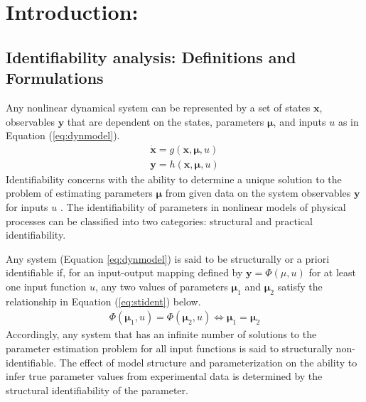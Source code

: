 \documentclass[10pt]{article}
\begin{document}
	\section{Introduction:}
	\subsection{Identifiability analysis: Definitions and Formulations}
	Any nonlinear dynamical system can be represented by a set of states $\mathbf{x}$, observables $\mathbf{y}$ that are dependent on the states, parameters $\mathbf{\mu}$, and inputs $u$ as in Equation (\ref{eq:dynmodel}). 
	\begin{subequations}\label{eq:dynmodel}
		\begin{align}
		\dot{\mathbf{x}} = g(\mathbf{x},\mathbf{\mu},u)\\
		\mathbf{y} = h(\mathbf{x},\mathbf{\mu},u)
		\end{align}
	\end{subequations}
	Identifiability concerns with the ability to determine a unique solution to the problem of estimating parameters $\mathbf{\mu}$ from given data on the system observables $\mathbf{y}$ for inputs $u$ \parencite{McLean2012}.	The identifiability of parameters in nonlinear models of physical processes can be classified into two categories: structural and practical identifiability. 
	
	Any system (Equation \ref{eq:dynmodel}) is said to be structurally or a priori identifiable if, for an input-output mapping defined by $\mathbf{y} = \Phi(\mu,u)$ for at least one input function $u$, any two values of parameters $\mathbf{\mu}_1$ and $\mathbf{\mu}_2$ satisfy the relationship in Equation (\ref{eq:stident}) below.
	\begin{align}\label{eq:stident}
	\Phi(\mathbf{\mu}_1,u) = \Phi(\mathbf{\mu}_2,u) \iff \mathbf{\mu}_1 = \mathbf{\mu}_2
	\end{align}
	Accordingly, any system that has an infinite number of solutions to the parameter estimation problem for all input functions is said to structurally non-identifiable. The effect of model structure and parameterization on the ability to infer true parameter values from experimental data is determined by the structural identifiability of the parameter. 
	
\end{document}
